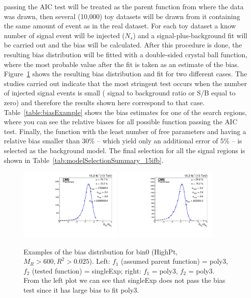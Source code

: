 passing the AIC test will be treated as the parent function from where
the data was drawn, then several (10,000) toy datasets will be drawn from
it containing the same amount of event as in the real dataset. For
each toy dataset a know number of signal event will be injected ($N_{s}$) and a signal-plus-background fit will be carried out and
the bias will be calculated. After this procedure is done, the
resulting bias distribution will be fitted with a double-sided
crystal ball function, where the most probable value after the fit is
taken as an estimate of the bias. Figure~\ref{fig:biasExample} shows
the resulting bias distribution and fit for two different
cases. The studies carried out indicate that the most stringent test
occurs when the number of injected signal events is small ( signal to
background ratio or S/B equal to zero) and therefore the results shown
here correspond to that case. Table~\ref{table:biasExample} shows the bias estimates for one of
the search regions, where you can see the relative biases for all
possible function passing the AIC test. Finally, the function with the
least number of free parameters and having a relative bias smaller than
30\% -- which yield only an additional error of 5\% -- is selected as
the background model. The final selection for all the signal regions
is shown in Table~\ref{tab:modelSelectionSummary_15ifb}.
\begin{figure}[h]
\begin{center}
\includegraphics[width=0.45\textwidth]{hgg/doubleTailCrystalBall_biasFits_poly3_singleExp.pdf}
\includegraphics[width=0.45\textwidth]{hgg/doubleTailCrystalBall_biasFits_poly3_poly3.pdf}
\caption{Examples of the bias distribution for bin0 (HighPt, $M_R>600, R^2>0.025$). Left: $f_{1}$ (assumed parent function) = poly3, $f_{2}$ (tested function) = singleExp; right: $f_{1}$ = poly3, $f_{2}$ =  poly3. From the left plot we can see that singleExp does not pass the bias test since it has large bias to fit poly3.  }
\label{fig:biasExample}
\end{center}
\end{figure}

